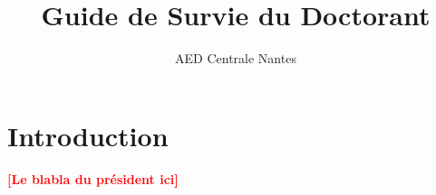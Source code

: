 \documentclass[11pt]{report}
\title{Guide de Survie du Doctorant}
\author{AED Centrale Nantes}
\newcommand{\todo}[1]{\textcolor{red}{\textbf{[#1]}}}
\begin{document}

\setcounter{page}{0}
\tableofcontents

\newpage
\chapter*{Introduction}
\todo{Le blabla du président ici}






\end{document}
